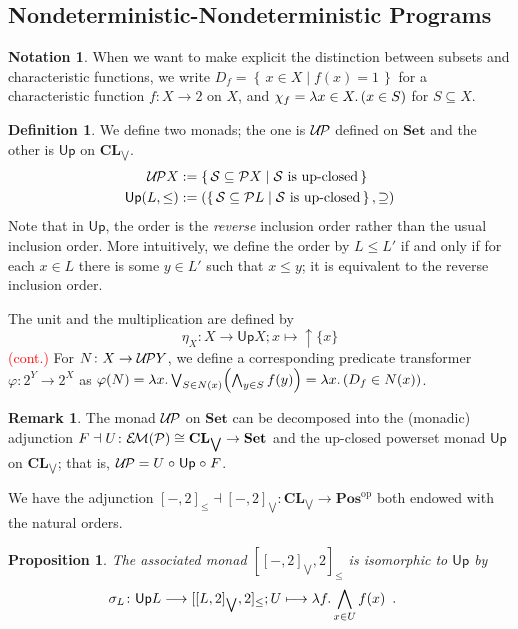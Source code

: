 \documentclass[9pt, preprint]{sigplanconf}
\theoremstyle{theorem}
\newtheorem{proposition}[theorem]{Proposition}
\theoremstyle{definition}
\newtheorem{definition}[theorem]{Definition}
\newtheorem{remark}[theorem]{Remark}
\newtheorem{notation}[theorem]{Notation}
\newcommand{\memo}[1]{\textcolor{red}{(#1)}}
\newcommand{\cont}{\memo{cont.}}
\newcommand{\calS}{\mathcal{S}}
\renewcommand{\phi}{\varphi}
\newcommand{\pow}{\mathcal{P}}
\newcommand{\set}[2]{\left\{\, #1 \mathrel{}\middle|\mathrel{} #2 \,\right\}}
\newcommand{\place}{{-}}
\newcommand{\op}{\mathrm{op}}
\newcommand{\Set}{\mathbf{Set}}
\newcommand{\Sets}{\Set}
\newcommand{\Pos}{\mathbf{Pos}}
\newcommand{\CL}{\mathbf{CL}}
\newcommand{\EM}{\mathcal{E}{\kern-.5ex}\mathcal{M}}
\newcommand{\biglor}{\bigvee}
\newcommand{\bigland}{\bigwedge}
\DeclarePairedDelimiter\p{(}{)}
\newcommand{\Upx}{\mathsf{Up}}
\renewcommand{\subset}{\subseteq}
\newcommand{\co}{\mathrel{\circ}}
\newcommand{\longto}{\longrightarrow}
\newcommand{\upcl}{\mathop{\uparrow}\nolimits}
\newcommand{\UP}{\mathcal{U{\kern-.3ex}P}}
\begin{document}
{\subsection{Nondeterministic-Nondeterministic Programs}
\label{sub:nondet-nondet}

\begin{notation}
  When we want to make explicit the distinction between
  subsets and characteristic functions,
  we write $D_f = \set{x \in X}{f(x) = 1}$
  for a characteristic function $f \colon X \to 2$ on $X$,
  and $\chi_f = \lambda x \in X \ldotp (x \in S)$ for $S \subset X$.
\end{notation}

\begin{definition}
  We define two monads; the one is $\UP$ defined on $\Sets$ and
  the other is $\Upx$ on $\CL_{\biglor}$.
  \begin{align*}
    \UP X &:= \set{\calS \subset \pow X}{\text{$\calS$ is up-closed}} \\
    \Upx (L, \le) &:= (\set{\calS \subset \pow L}{\text{$\calS$ is up-closed}}, \supseteq)
  \end{align*}
  Note that in $\Upx$, the order is the \emph{reverse} inclusion order
  rather than the usual inclusion order.
  More intuitively, we define the order by $L \le L'$ if and only if
  for each $x \in L$ there is some $y \in L'$ such that $x \le y$;
  it is equivalent to the reverse inclusion order.

  The unit and the multiplication are defined by
  \[
    \eta_X \colon X \longto \Upx X; x \longmapsto \upcl \{x\}
  \] \cont
  For $N \colon X \to \UP Y$, we define a corresponding
  predicate transformer $\phi \colon 2^Y \to 2^X$ as
  $\phi(N) = \lambda x \ldotp \biglor_{S \in N(x)} \p*{ \bigland_{y \in S} f(y)}
    = \lambda x \ldotp \p*{D_f \in N(x)}$.
\end{definition}

\begin{remark}
  The monad $\UP$ on $\Set$ can be decomposed into the (monadic) adjunction
  $F \dashv U \colon \EM(\pow) \cong \CL_{\biglor} \to \Set$ and
  the up-closed powerset monad $\Upx$ on $\CL_{\biglor}$;
  that is, $\UP = U \co \Upx \co F$.
\end{remark}

We have the adjunction
$[\place, 2]_{\le} \dashv [\place, 2]_{\biglor} \colon \CL_{\biglor} \to \Pos^{\op}$
both endowed with the natural orders.

\begin{proposition}
  \label{prop:SPisomUpx}
  The associated monad $[[\place, 2]_{\biglor}, 2]_{\leq}$ is
  isomorphic to $\Upx$ by
  \begin{align*}
    \sigma_L \colon \Upx L &\longto [[L, 2]_{\biglor}, 2]_{\leq};
      U \longmapsto \lambda f \ldotp \bigland_{x \in U} f(x) \enspace .
  \end{align*}
\end{proposition}


}
\end{document}
